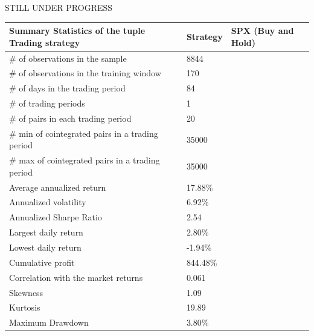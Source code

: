 \documentclass[11pt,a4,twosided,singlespacing,titlepagenumber=on]{scrreprt}
\numberwithin{equation}{chapter} %
\theoremstyle{remark}
\begin{document}
\newpage
STILL UNDER PROGRESS
\begin{table}[H]
\centering
\begin{tabular}{lll}
\hline
Summary Statistics of the tuple Trading strategy  			& Strategy & SPX (Buy and Hold)\\ \hline
\# of observations in the sample								& 8844  \\
\# of observations in the training window						& 170 \\
\# of days in the trading period								& 84 \\
\# of trading periods											& 1\\
\# of pairs in each trading period   							& 20\\
\# min of cointegrated pairs in a trading period 				& 35000\\
\# max of cointegrated pairs in a trading period 				& 35000\\
Average annualized return 										& 17.88\% \\
Annualized volatility 											& 6.92\% \\
Annualized Sharpe Ratio 										& 2.54  \\
Largest daily return 											& 2.80\% \\
Lowest daily return 											& -1.94\% \\
Cumulative profit 												& 844.48\%\\
Correlation with the market returns 							& 0.061\\
Skewness														& 1.09\\
Kurtosis 														& 19.89\\
Maximum Drawdown  												& 3.80\% \\
\hline
\end{tabular}
\end{table}

\cleardoublepage
{}
{} %



\end{document}
